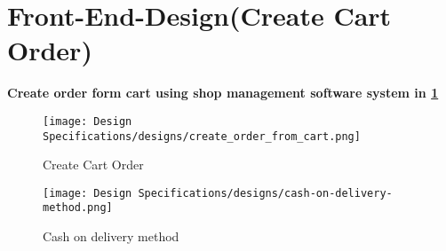 \section{Front-End-Design(Create Cart Order)}
\vspace{0.2cm}
\textbf{Create order form cart using shop management software system in \ref{fig:fig 5.5}}\\
\begin{figure}[ht]
    \centering  
    \texttt{[image: Design Specifications/designs/create\_order\_from\_cart.png]}    
    \caption{Create Cart Order}
    \label{fig:fig 5.5}
\end{figure}
\begin{figure}[ht]
    \centering  
    \texttt{[image: Design Specifications/designs/cash-on-delivery-method.png]}    
    \caption{Cash on delivery method}
    \label{fig:fig 5.6}
\end{figure}